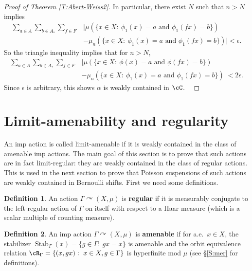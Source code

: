 \documentclass[12pt]{article}
\theoremstyle{plain}
\theoremstyle{definition}
\newtheorem{defn}{Definition}
\theoremstyle{remark}
\newcommand{\G}{\Gamma}
\newcommand{\eps}{\epsilon}
\renewcommand\a{\alpha}
\newcommand\Stab{\operatorname{Stab}}
\def\cc{{\curvearrowright}}
\begin{document}
\begin{proof}[Proof of Theorem \ref{T:Abert-Weiss2}]

In particular, there exist $N$ such that $n>N$ implies
\begin{align*}
\sum_{a\in A} \sum_{b\in A_*} \sum_{f\in F} &\big|\mu(\{x\in X:~\phi_1(x)=a \textrm{ and }   \phi_1(fx)=b\}) \\
&- \mu_n(\{x\in X:~\phi_1(x)=a \textrm{ and }   \phi_1(fx)=b \}) \big| < \eps.
\end{align*}
So the triangle inequality implies that for $n>N$,
\begin{align*}
\sum_{a\in A} \sum_{b\in A_*} \sum_{f\in F} &\big|\mu(\{x\in X:~\phi(x)=a \textrm{ and }   \phi(fx)=b\}) \\
&- \mu_n(\{x\in X:~\phi_1(x)=a \textrm{ and }   \phi_1(fx)=b \}) \big| < 2\eps.
\end{align*}
Since $\eps$ is arbitrary, this shows $\a$ is weakly contained in $\cC$.
\
\end{proof}

\section{Limit-amenability and regularity}\label{S:limit-amenability}

An imp action is called limit-amenable if it is weakly contained in the class of amenable imp actions. The main goal of this section is to prove that such actions are in fact limit-regular: they are weakly contained in the class of regular actions. This is used in the next section to prove that Poisson suspensions of such actions are weakly contained in Bernoulli shifts. First we need some definitions.


\begin{defn}
    An action $\G \cc (X,\mu)$ is {\bf regular} if it is measurably conjugate to the left-regular action of $\G$ on itself with respect to a Haar measure (which is a scalar multiple of counting measure). 
\end{defn}

\begin{defn}
    An imp action $\G \cc (X,\mu)$ is {\bf amenable} if for a.e.\ $x\in X$, the stabilizer $\Stab_\G(x)=\{g\in \G:~gx=x\}$ is amenable and the orbit equivalence relation $\cR_\G=\{(x,gx):~x\in X, g\in \G\}$ is hyperfinite mod $\mu$ (see \S \ref{S:mer} for definitions).
\end{defn}
\end{document}
